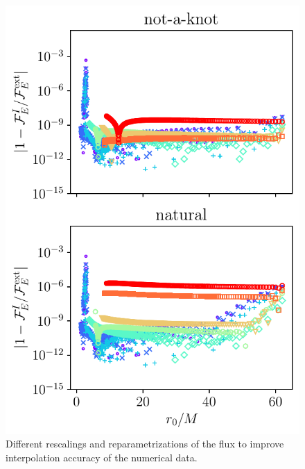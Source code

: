 \documentclass[%
 reprint,
 nofootinbib,
 amsmath,amssymb,
 aps,
 prd,
]{revtex4-2}
\begin{document}
\begin{figure}[bhtp]
    \centering
    \includegraphics[width=0.95\linewidth]{figures/boundary_condition_comparison.pdf}
    \caption{Different rescalings and reparametrizations of the flux to improve interpolation accuracy of the numerical data.}
    \label{fig:fluxComparison2}
\end{figure}
\end{document}
